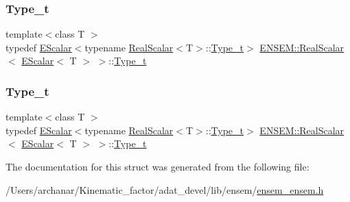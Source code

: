 \subsubsection{\texorpdfstring{Type\_t}{Type\_t}\hspace{0.1cm}{\footnotesize\ttfamily [1/2]}}
{\footnotesize\ttfamily template$<$class T $>$ \\
typedef \mbox{\hyperlink{classENSEM_1_1EScalar}{E\+Scalar}}$<$typename \mbox{\hyperlink{structENSEM_1_1RealScalar}{Real\+Scalar}}$<$T$>$\+::\mbox{\hyperlink{structENSEM_1_1RealScalar_3_01EScalar_3_01T_01_4_01_4_a5aaad1821350deadcff050085f21ff07}{Type\+\_\+t}}$>$ \mbox{\hyperlink{structENSEM_1_1RealScalar}{E\+N\+S\+E\+M\+::\+Real\+Scalar}}$<$ \mbox{\hyperlink{classENSEM_1_1EScalar}{E\+Scalar}}$<$ T $>$ $>$\+::\mbox{\hyperlink{structENSEM_1_1RealScalar_3_01EScalar_3_01T_01_4_01_4_a5aaad1821350deadcff050085f21ff07}{Type\+\_\+t}}}

\mbox{\label{structENSEM_1_1RealScalar_3_01EScalar_3_01T_01_4_01_4_a5aaad1821350deadcff050085f21ff07}} 
\subsubsection{\texorpdfstring{Type\_t}{Type\_t}\hspace{0.1cm}{\footnotesize\ttfamily [2/2]}}
{\footnotesize\ttfamily template$<$class T $>$ \\
typedef \mbox{\hyperlink{classENSEM_1_1EScalar}{E\+Scalar}}$<$typename \mbox{\hyperlink{structENSEM_1_1RealScalar}{Real\+Scalar}}$<$T$>$\+::\mbox{\hyperlink{structENSEM_1_1RealScalar_3_01EScalar_3_01T_01_4_01_4_a5aaad1821350deadcff050085f21ff07}{Type\+\_\+t}}$>$ \mbox{\hyperlink{structENSEM_1_1RealScalar}{E\+N\+S\+E\+M\+::\+Real\+Scalar}}$<$ \mbox{\hyperlink{classENSEM_1_1EScalar}{E\+Scalar}}$<$ T $>$ $>$\+::\mbox{\hyperlink{structENSEM_1_1RealScalar_3_01EScalar_3_01T_01_4_01_4_a5aaad1821350deadcff050085f21ff07}{Type\+\_\+t}}}



The documentation for this struct was generated from the following file\+:\begin{DoxyCompactItemize}
\item 
/\+Users/archanar/\+Kinematic\+\_\+factor/adat\+\_\+devel/lib/ensem/\mbox{\hyperlink{lib_2ensem_2ensem__ensem_8h}{ensem\+\_\+ensem.\+h}}\end{DoxyCompactItemize}
